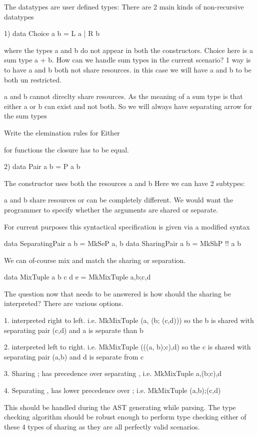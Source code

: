 The datatypes are user defined types:
There are 2 main kinds of non-recursive datatypes

1) data Choice a b = L a | R b

where the types a and b do not appear in both the constructors.
Choice here is a sum type a + b. How can we handle sum types in the current scenario?
1 way is to have a and b both not share resources. in this case we will have
a and b to be both un restricted.

a and b cannot direclty share resources. As the meaning of a sum type is that
either a or b can exist and not both. So we will always have separating arrow
for the sum types

Write the elemination rules for Either

for functions the closure has to be equal.

2) data Pair a b = P a b

The constructor uses both the resources a and b
Here we can have 2 subtypes:

a and b share resources or can be completely different.
We would want the programmer to specify whether the arguments are shared or separate.

For current purposes this syntactical specification is given via a modified syntax

data SeparatingPair a b = MkSeP a, b
data SharingPair a b = MkShP !! a b

We can of-course mix and match the sharing or separation.

data MixTuple a b c d e = MkMixTuple a,b;c,d

The question now that needs to be answered is how should the sharing be interpreted?
There are various options.

1. interpreted right to left. i.e. MkMixTuple (a, (b; (c,d)))
   so the b is shared with separating pair (c,d) and a is separate than b

2. interpreted left to right. i.e. MkMixTuple (((a, b);c),d)
   so the c is shared with separating pair (a,b) and d is separate from c

3. Sharing ; has precedence over separating , i.e. MkMixTuple a,(b;c),d

4. Separating , has lower precedence over ; i.e. MkMixTuple (a,b);(c,d)

This should be handled during the AST generating while parsing.
The type checking algorithm should be robust enough
to perform type checking either of these 4 types of sharing as they are
all perfectly valid scenarios.

